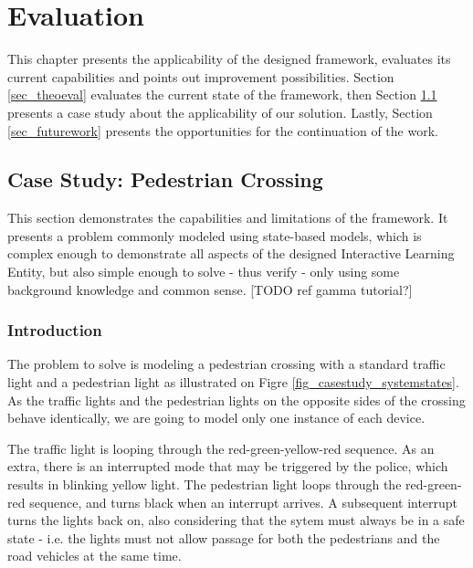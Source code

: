 \chapter{Evaluation}
This chapter presents the applicability of the designed framework, evaluates its current capabilities and points out improvement possibilities. Section \ref{sec_theoeval} evaluates the current state of the framework, then Section \ref{sec_casestudy} presents a case study about the applicability of our solution. Lastly, Section \ref{sec_futurework} presents the opportunities for the continuation of the work.

\section{Case Study: Pedestrian Crossing} \label{sec_casestudy}
This section demonstrates the capabilities and limitations of the framework. It presents a problem commonly modeled using state-based models, which is complex enough to demonstrate all aspects of the designed Interactive Learning Entity, but also simple enough to solve - thus verify - only using some background knowledge and common sense. [TODO ref gamma tutorial?]

\subsection{Introduction} \label{subs_casestudyintro}

The problem to solve is modeling a pedestrian crossing with a standard traffic light and a pedestrian light as illustrated on Figre \ref{fig_casestudy_systemstates}. As the traffic lights and the pedestrian lights on the opposite sides of the crossing behave identically, we are going to model only one instance of each device. 

The traffic light is looping through the red-green-yellow-red sequence. As an extra, there is an interrupted mode that may be triggered by the police, which results in blinking yellow light. The pedestrian light loops through the red-green-red sequence, and turns black when an interrupt arrives. A subsequent interrupt turns the lights back on, also considering that the sytem must always be in a safe state - i.e. the lights must not allow passage for both the pedestrians and the road vehicles at the same time.

